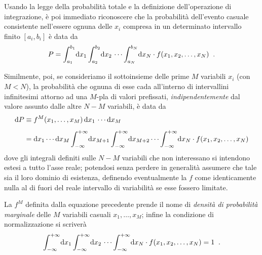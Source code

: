 Usando la legge della probabilit\`a totale e la definizione
dell'operazione di integrazione, \`e poi immediato
riconoscere che la probabilit\`a dell'evento casuale
consistente nell'essere ognuna delle $x_i$ compresa in un
determinato intervallo finito $[a_i, b_i]$ \`e data da
\begin{equation*}
  P = \int_{a_1}^{b_1} \! \de x_1 \int_{a_2}^{b_2} \!
    \de x_2 \, \cdots \int_{a_N}^{b_N} \! \de x_N \cdot
    f(x_1, x_2,\ldots, x_N) \peq .
\end{equation*}

%
Similmente, poi, se consideriamo il sottoinsieme delle prime
$M$ variabili $x_i$ (con $M < N$), la probabilit\`a che
ognuna di esse cada all'interno di intervallini infinitesimi
attorno ad una $M$-pla di valori prefissati,
\emph{indipendentemente} dal valore assunto dalle altre
$N-M$ variabili, \`e data da
\begin{align*}
  \de P &\equiv f^M (x_1,\ldots,x_M) \, \de x_1 \,
    \cdots \de x_M \\[1ex]
  &= \de x_1 \cdots \de x_M
    \int_{-\infty}^{+\infty} \! \de x_{M+1}
    \int_{-\infty}^{+\infty} \! \de x_{M+2} \cdots
    \int_{-\infty}^{+\infty} \! \de x_N \cdot
    f(x_1, x_2,\ldots, x_N)
\end{align*}
dove gli integrali definiti sulle $N-M$ variabili che non
interessano si intendono estesi a tutto l'asse reale;
potendosi senza perdere in generalit\`a assumere che tale
sia il loro dominio di esistenza, definendo eventualmente la
$f$ come identicamente nulla al di fuori del reale
intervallo di variabilit\`a se esse fossero limitate.

La $f^M$ definita dalla equazione precedente prende il nome
di \emph{densit\`a di probabilit\`a marginale} delle $M$
variabili casuali $x_1,\ldots,x_M$;%
infine la condizione di normalizzazione si scriver\`a
\begin{equation*}%
\index{normalizzazione!condizione di}
  \int_{-\infty}^{+\infty} \! \de x_1
    \int_{-\infty}^{+\infty} \! \de x_2 \, \cdots
    \int_{-\infty}^{+\infty} \! \de x_N \cdot
    f(x_1, x_2,\ldots, x_N) = 1 \peq .
\end{equation*}

